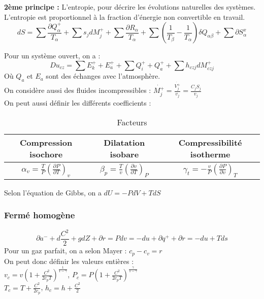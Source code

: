\documentclass[../main.tex]{subfiles}
\begin{document}
\textbf{2ème principe :} L'entropie, pour décrire les évolutions naturelles des systèmes. L'entropie est proportionnel à la fraction d'énergie non convertible en travail. \\

\begin{equation}
    dS = \sum \frac{\partial Q_{\alpha}^+}{T_{\alpha}} + \sum s_j dM_j^+ + \sum \frac{\partial R_{\alpha}}{T_{\alpha}} + \sum (\frac{1}{T_{\beta}}-\frac{1}{T_{\alpha}}) \delta Q_{\alpha\beta} + \sum \partial S_{\alpha
    }^x
\end{equation}

Pour un système ouvert, on a : \\
\begin{equation}
    Du_{cz} = \sum E_k^+ + E_a^+ + \sum Q^+_i + Q_a^+ + \sum h_{czj}dM_{czj}^+
\end{equation}
Où $Q_a$ et $E_a$ sont des échanges avec l'atmosphère.\\

On considère aussi des fluides incompressibles : $\dot{M_j^+} = \frac{\dot{V_j^+}}{v_j} = \frac{C_j S_j}{v_j}$\\

On peut aussi définir les différents coefficients :\\
\begin{table}[hbt!]
    \centering
    \begin{tabular}{||c|c|c|}
        \hline
        Compression isochore& Dilatation isobare & Compressibilité isotherme \\
        \hline
        $\alpha_v = \frac{T}{P} (\frac{\partial P}{\partial T})_v$& $\beta_p = \frac{T}{v} (\frac{\partial v}{\partial T})_P$ & $\gamma_t = -\frac{v}{P} (\frac{\partial P}{\partial v})_T$\\
        \hline
    \end{tabular}
    \caption{Facteurs}
\end{table}

Selon l'équation de Gibbs, on a $dU = -PdV + TdS$\\

\subsubsection{Fermé homogène}
\begin{equation}
    \partial a^- + d\frac{C^2}{2} + gdZ + \partial r = Pdv = -du + \partial q^+ + \partial r = -du + Tds
\end{equation}
Pour un gaz parfait, on a selon Mayer : $c_p-c_v = r$\\
On peut donc définir les valeurs entières : \\
$v_c = v(1+\frac{C^2}{2c_p T})^{\frac{1}{1-\gamma}}$, $P_c = P(1+\frac{C^2}{2c_p T})^{\frac{\gamma}{1-\gamma}}$\\
$T_c = T+\frac{C^2}{2c_p}$, $h_c = h+\frac{C^2}{2}$\\
\end{document}
